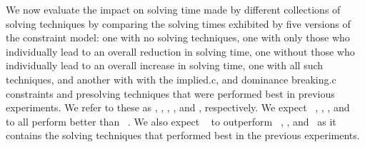 We now evaluate the impact on solving time made by different collections of
solving techniques by comparing the solving times exhibited by five versions of
the \gls{constraint model}: one with no solving techniques, one with only those
who individually lead to an overall reduction in solving time, one without those
who individually lead to an overall increase in solving time, one with all such
techniques, and another with with the \gls{implied.c},  and \gls{dominance breaking.c} \glspl{constraint} and
\gls{presolving} techniques that were performed best in previous experiments.
%
We refer to these  as \modelA, \modelB, \modelC,
\modelD, and \modelE, respectively.
%
We expect ~\modelB, \modelC, \modelD, and~\modelE{}
to all perform better than ~\modelA.
%
We also expect ~\modelE{} to outperform
~\modelB, \modelC, and~\modelD{} as it contains the
solving techniques that performed best in the previous experiments.


